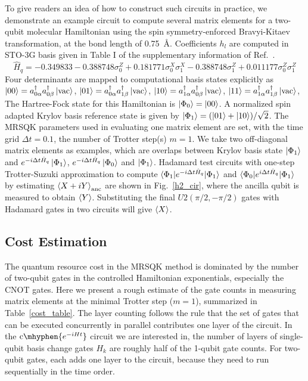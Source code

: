\documentclass[journal=jctcce,manuscript=article]{achemso}
\newcommand{\methodabbr}[0]{MRSQK\xspace}
\newcommand{\controlop}[1]{\mathrm{c}\mhyphen{#1}}
\begin{document}
To give readers an idea of how to construct such circuits in practice, we demonstrate an example circuit to compute several matrix elements for a two-qubit molecular  Hamiltonian\cite{OMalley:2016dc} using the spin symmetry-enforced Bravyi-Kitaev transformation,\cite{Moll_2016, Bravyi:2017wb} at the bond length of 0.75~\AA{}. Coefficients $h_l$ are computed in STO-3G basis given in Table I of the supplementary information of Ref.~. 
\begin{equation}
\hat{H}_q = -0.349833 - 0.388748\sigma_0^Z  + 0.181771\sigma_0^X \sigma_1^X - 0.388748 \sigma_1^Z + 0.011177\sigma_0^Z \sigma_1^Z
\end{equation}
Four determinants are mapped to computational basis states explicitly as 
$\left\vert{00}\right\rangle = a_{0 \alpha}^{\dagger} a_{0 \beta}^{\dagger}  \left\vert{\mathrm{vac}}\right\rangle$, 
$\left\vert{01}\right\rangle = a_{0 \alpha}^{\dagger} a_{1 \beta}^{\dagger}  \left\vert{\mathrm{vac}}\right\rangle$, 
$\left\vert{10}\right\rangle = a_{1 \alpha}^{\dagger} a_{0 \beta}^{\dagger}  \left\vert{\mathrm{vac}}\right\rangle$, 
$\left\vert{11}\right\rangle = a_{1 \alpha}^{\dagger} a_{1 \beta}^{\dagger}  \left\vert{\mathrm{vac}}\right\rangle$, 
The Hartree-Fock state for this Hamiltonian is $\left\vert{\Phi_0}\right\rangle = \left\vert{00}\right\rangle$.
A normalized spin adapted Krylov basis reference state is given by $\left\vert{\Phi_1}\right\rangle= (\left\vert{01}\right\rangle + \left\vert{10}\right\rangle ) / \sqrt{2}$.
The \methodabbr parameters used in evaluating one matrix element are set, with the time grid $\Delta t = 0.1$, the number of Trotter step(s) $m=1$.  
We take two off-diagonal matrix elements as examples, which are overlaps between Krylov basis state $\left\vert{\Phi_1}\right\rangle$ and $e^{-i \Delta t \hat{H}_q }  \left\vert{\Phi_1}\right\rangle$, $e^{-i \Delta t \hat{H}_q }  \left\vert{\Phi_0}\right\rangle$ and $\left\vert{\Phi_1}\right\rangle$.
Hadamard test circuits with one-step Trotter-Suzuki approximation to compute $\braket{\Phi_1  | e^{-i \Delta t \hat{H}_q}  |  \Phi_1}$ and $\braket{\Phi_0  | e^{i \Delta t \hat{H}_q}  |  \Phi_1}$
by estimating $\braket{X+iY}_\mathrm{anc}$ are shown in Fig.~\ref{h2_cir}, where the ancilla qubit is measured to obtain $\braket{Y}$.
Substituting the final $U2(\pi/2, -\pi/2)$ gates with Hadamard gates in two circuits will give $\braket{X}$. 


\subsection{Cost Estimation}

The quantum resource cost in the \methodabbr method is dominated by the number of two-qubit gates in the controlled Hamiltonian exponentials, especially the CNOT gates. 
Here we present a rough estimate of the gate counts in measuring matrix elements at the minimal Trotter step ($m=1$), summarized in Table~\ref{cost_table}. 
The layer counting follows the rule that the set of gates that can be executed concurrently in parallel contributes one layer of the circuit.
In the $\controlop{e^{-i H t}}$ circuit we are interested in, the number of layers of single-qubit basis change gates $H_k$ are roughly half of the 1-qubit gate counts. For two-qubit gates, each adds one layer to the circuit, because they need to run sequentially in the time order.
\end{document}
